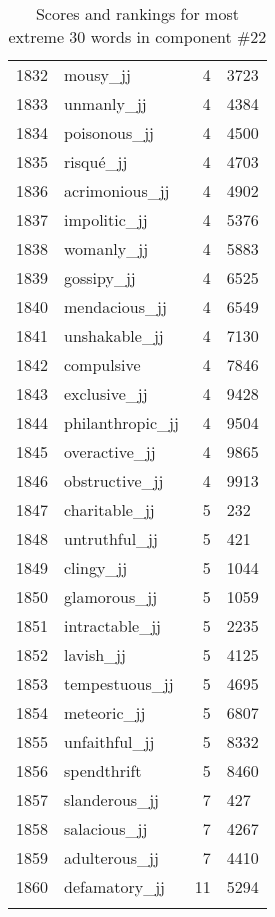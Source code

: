 \begin{longtable}[!htbp]{| rlr@{.}l |}
    1832 & mousy\_jj & 4 & 3723 \\
    1833 & unmanly\_jj & 4 & 4384 \\
    1834 & poisonous\_jj & 4 & 4500 \\
    1835 & risqué\_jj & 4 & 4703 \\
    1836 & acrimonious\_jj & 4 & 4902 \\
    1837 & impolitic\_jj & 4 & 5376 \\
    1838 & womanly\_jj & 4 & 5883 \\
    1839 & gossipy\_jj & 4 & 6525 \\
    1840 & mendacious\_jj & 4 & 6549 \\
    1841 & unshakable\_jj & 4 & 7130 \\
    1842 & compulsive & 4 & 7846 \\
    1843 & exclusive\_jj & 4 & 9428 \\
    1844 & philanthropic\_jj & 4 & 9504 \\
    1845 & overactive\_jj & 4 & 9865 \\
    1846 & obstructive\_jj & 4 & 9913 \\
    1847 & charitable\_jj & 5 & 232 \\
    1848 & untruthful\_jj & 5 & 421 \\
    1849 & clingy\_jj & 5 & 1044 \\
    1850 & glamorous\_jj & 5 & 1059 \\
    1851 & intractable\_jj & 5 & 2235 \\
    1852 & lavish\_jj & 5 & 4125 \\
    1853 & tempestuous\_jj & 5 & 4695 \\
    1854 & meteoric\_jj & 5 & 6807 \\
    1855 & unfaithful\_jj & 5 & 8332 \\
    1856 & spendthrift & 5 & 8460 \\
    1857 & slanderous\_jj & 7 & 427 \\
    1858 & salacious\_jj & 7 & 4267 \\
    1859 & adulterous\_jj & 7 & 4410 \\
    1860 & defamatory\_jj & 11 & 5294 \\
    \hline
    \caption{Scores and rankings for most extreme 30 words in component \#22} \\
\end{longtable}
